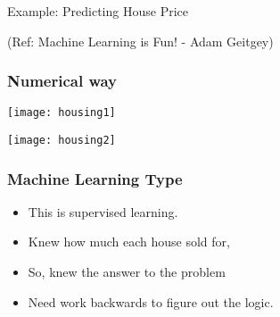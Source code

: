 %
%
%
%

\begin{frame}[fragile]\frametitle{}
\begin{center}
{\Large Example: Predicting House Price}
\end{center}

{\tiny (Ref: Machine Learning is Fun! - Adam Geitgey)}
\end{frame}

\begin{frame}[fragile]\frametitle{Numerical way}
\begin{center}
\texttt{[image: housing1]}
\end{center}
\begin{center}
\texttt{[image: housing2]}
\end{center}
\end{frame}

\begin{frame}[fragile]\frametitle{Machine Learning Type}
\begin{itemize}
\item This is supervised learning. 
\item Knew how much each house sold for, 
\item So, knew the answer to the problem 
\item Need work backwards to figure out the logic.
\end{itemize}
\end{frame}

